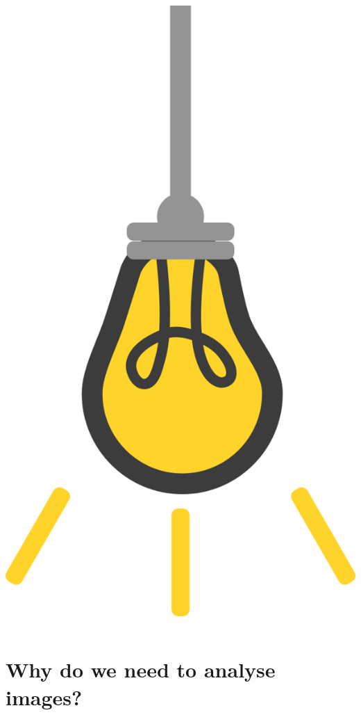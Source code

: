 \documentclass[9pt, aspectratio=169]{beamer}
\begin{document}
\begin{frame}
\begin{columns}
\begin{column}{0.2\textwidth}
            \includegraphics[angle=-30, origin=tr, width=1.5\textwidth]{lightbulb.png}
        \end{column}
    \end{columns}
\end{frame}

\section{Why do we need to analyse images?}
\end{document}
